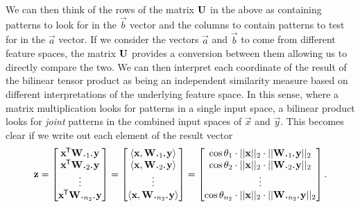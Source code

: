 We can then think of the rows of the matrix \(\mathbf{U}\) in the
above as containing patterns to look for in the \(\vec{b}\) vector and the columns to
contain patterns to test for in the \(\vec{a}\) vector. If we consider the vectors 
\(\vec{a}\) and \(\vec{b}\) to come from different feature spaces, the matrix \(\mathbf{U}\)
provides a conversion between them allowing us to directly compare the two. We can then
interpret each coordinate of the result of the bilinear tensor product as being an
independent similarity measure based on different interpretations of the underlying
feature space. In this sense, where a matrix multiplication looks for patterns in a single input
space, a bilinear product looks for \emph{joint} patterns in the combined input spaces of
\(\vec{x}\) and \(\vec{y}\). This becomes clear if we write out each element of the result
vector
\begin{equation} \label{eq:features}
	\vec{z} = \begin{bmatrix}
		\tran{\vec{x}}\mat{W}_{\midbullet 1 \midbullet}\vec{y} \\
		\tran{\vec{x}}\mat{W}_{\midbullet 2 \midbullet}\vec{y} \\
		\vdots \\
		\tran{\vec{x}}\mat{W}_{\midbullet n_2 \midbullet}\vec{y}
	\end{bmatrix}
	= \begin{bmatrix}
		\langle\vec{x}, \mat{W}_{\midbullet 1 \midbullet} \vec{y}\rangle \\
		\langle\vec{x}, \mat{W}_{\midbullet 2 \midbullet} \vec{y}\rangle \\
		\vdots \\
		\langle\vec{x}, \mat{W}_{\midbullet n_2 \midbullet} \vec{y}\rangle
	\end{bmatrix}
	 = \begin{bmatrix}
	 	\cos \theta_1 \cdot ||\vec{x}||_2 \cdot ||\mat{W}_{\midbullet 1 \midbullet}\vec{y}||_2 \\
	 	\cos \theta_2 \cdot ||\vec{x}||_2 \cdot ||\mat{W}_{\midbullet 2 \midbullet}\vec{y}||_2 \\
		\vdots \\
	 	\cos \theta_{n_2} \cdot ||\vec{x}||_2 \cdot ||\mat{W}_{\midbullet n_2 \midbullet}\vec{y}||_2 \\
	 \end{bmatrix}.
\end{equation}


